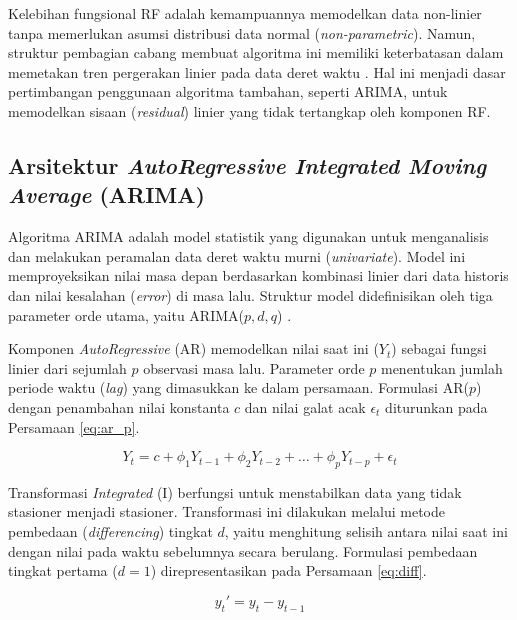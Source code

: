 Kelebihan fungsional RF adalah kemampuannya memodelkan data non-linier tanpa memerlukan asumsi distribusi data normal (\textit{non-parametric}). Namun, struktur pembagian cabang membuat algoritma ini memiliki keterbatasan dalam memetakan tren pergerakan linier pada data deret waktu \autocite{yenkikar2025explainable}. Hal ini menjadi dasar pertimbangan penggunaan algoritma tambahan, seperti ARIMA, untuk memodelkan sisaan (\textit{residual}) linier yang tidak tertangkap oleh komponen RF.

\newpage

\subsection{Arsitektur \textit{AutoRegressive Integrated Moving Average} (ARIMA)}

Algoritma ARIMA adalah model statistik yang digunakan untuk menganalisis dan melakukan peramalan data deret waktu murni (\textit{univariate}). Model ini memproyeksikan nilai masa depan berdasarkan kombinasi linier dari data historis dan nilai kesalahan (\textit{error}) di masa lalu. Struktur model didefinisikan oleh tiga parameter orde utama, yaitu ARIMA($p, d, q$) \autocite{yunis2024hybridization}.

Komponen \textit{AutoRegressive} (AR) memodelkan nilai saat ini ($Y_t$) sebagai fungsi linier dari sejumlah $p$ observasi masa lalu. Parameter orde $p$ menentukan jumlah periode waktu (\textit{lag}) yang dimasukkan ke dalam persamaan. Formulasi AR($p$) dengan penambahan nilai konstanta $c$ dan nilai galat acak $\epsilon_t$ diturunkan pada Persamaan \ref{eq:ar_p}.

\begin{equation}
Y_t = c + \phi_1 Y_{t-1} + \phi_2 Y_{t-2} + \dots + \phi_p Y_{t-p} + \epsilon_t
\label{eq:ar_p}
\end{equation}

Transformasi \textit{Integrated} (I) berfungsi untuk menstabilkan data yang tidak stasioner menjadi stasioner. Transformasi ini dilakukan melalui metode pembedaan (\textit{differencing}) tingkat $d$, yaitu menghitung selisih antara nilai saat ini dengan nilai pada waktu sebelumnya secara berulang. Formulasi pembedaan tingkat pertama ($d=1$) direpresentasikan pada Persamaan \ref{eq:diff}.

\begin{equation}
y_t' = y_t - y_{t-1}
\label{eq:diff}
\end{equation}

